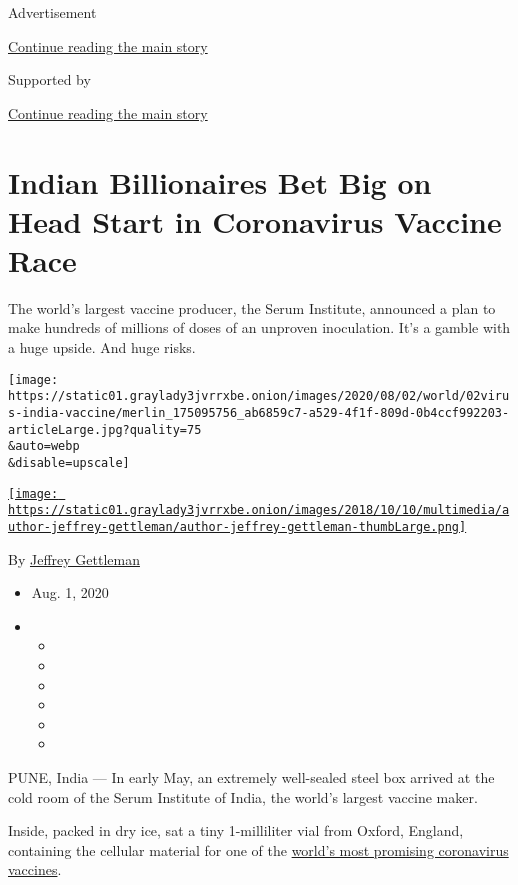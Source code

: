 Advertisement

\protect\hyperlink{after-top}{Continue reading the main story}

Supported by

\protect\hyperlink{after-sponsor}{Continue reading the main story}

\hypertarget{indian-billionaires-bet-big-on-head-start-in-coronavirus-vaccine-race}{%
\section{Indian Billionaires Bet Big on Head Start in Coronavirus
Vaccine
Race}\label{indian-billionaires-bet-big-on-head-start-in-coronavirus-vaccine-race}}

The world's largest vaccine producer, the Serum Institute, announced a
plan to make hundreds of millions of doses of an unproven inoculation.
It's a gamble with a huge upside. And huge risks.

\texttt{[image: https://static01.graylady3jvrrxbe.onion/images/2020/08/02/world/02virus-india-vaccine/merlin\_175095756\_ab6859c7-a529-4f1f-809d-0b4ccf992203-articleLarge.jpg?quality=75\\\&auto=webp\\\&disable=upscale]}

\href{https://www.nytimes3xbfgragh.onion/by/jeffrey-gettleman}{\texttt{[image: https://static01.graylady3jvrrxbe.onion/images/2018/10/10/multimedia/author-jeffrey-gettleman/author-jeffrey-gettleman-thumbLarge.png]}}

By
\href{https://www.nytimes3xbfgragh.onion/by/jeffrey-gettleman}{Jeffrey
Gettleman}

\begin{itemize}
\item
  Aug. 1, 2020
\item
  \begin{itemize}
  \item
  \item
  \item
  \item
  \item
  \item
  \end{itemize}
\end{itemize}

PUNE, India --- In early May, an extremely well-sealed steel box arrived
at the cold room of the Serum Institute of India, the world's largest
vaccine maker.

Inside, packed in dry ice, sat a tiny 1-milliliter vial from Oxford,
England, containing the cellular material for one of the
\href{https://www.nytimes3xbfgragh.onion/2020/04/27/world/europe/coronavirus-vaccine-update-oxford.html}{world's
most promising coronavirus vaccines}.

